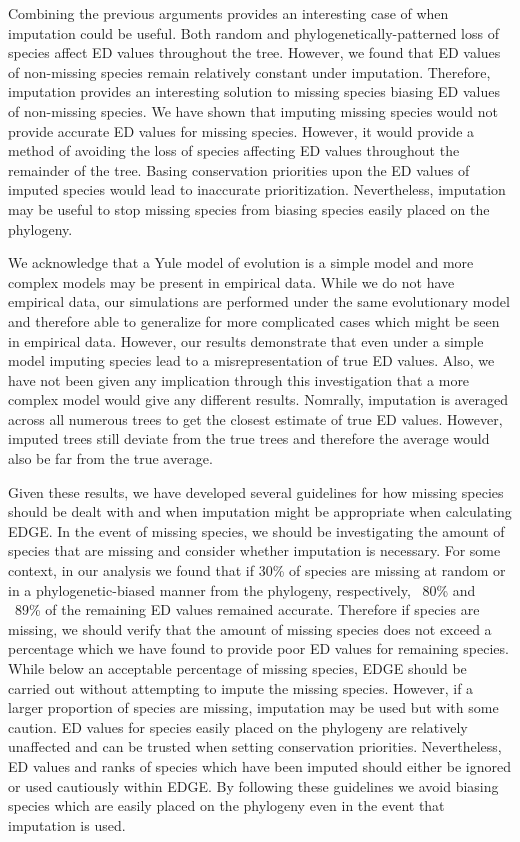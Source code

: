 \documentclass[12pt,english]{article}
\begin{document}
Combining the previous arguments provides an interesting case of when imputation
could be useful. Both random and phylogenetically-patterned loss of species
affect ED values throughout the tree. However, we found that ED values of
non-missing species remain relatively constant under imputation. Therefore,
imputation provides an interesting solution to missing species biasing ED
values of non-missing species. We have shown that imputing missing species would
not provide accurate ED values for missing species. However, it would provide a
method of avoiding the loss of species affecting ED values throughout the
remainder of the tree. Basing conservation priorities upon the ED values of
imputed species would lead to inaccurate prioritization. Nevertheless,
imputation may be useful to stop missing species from biasing species easily
placed on the phylogeny.

We acknowledge that a Yule model of evolution is a simple model and more complex
models may be present in empirical data. While we do not have empirical data,
our simulations are performed under the same evolutionary model and therefore
able to generalize for more complicated cases which might be seen in empirical
data. However, our results demonstrate that even under a simple model imputing
species lead to a misrepresentation of true ED values. Also, we have not been
given any implication through this investigation that a more complex model would
give any different results. Nomrally, imputation is averaged across all numerous
trees to get the closest estimate of true ED values. However, imputed trees
still deviate from the true trees and therefore the average would also be far
from the true average.

Given these results, we have developed several guidelines for how missing
species should be dealt with and when imputation might be appropriate when
calculating EDGE. In the event of missing species, we should be investigating
the amount of species that are missing and consider whether imputation is
necessary. For some context, in our analysis we found that if 30\% of species
are missing at random or in a phylogenetic-biased manner from the phylogeny,
respectively, ~80\% and ~89\% of the remaining ED values remained accurate.
Therefore if species are missing, we should verify that the amount of missing
species does not exceed a percentage which we have found to provide poor ED
values for remaining species. While below an acceptable percentage of missing
species, EDGE should be carried out without attempting to impute the
missing species. However, if a larger proportion of species are missing,
imputation may be used but with some caution. ED values for species easily
placed on the phylogeny are relatively unaffected and can be trusted when
setting conservation priorities. Nevertheless, ED values and ranks of species
which have been imputed should either be ignored or used cautiously within EDGE.
By following these guidelines we avoid biasing species which are easily placed
on the phylogeny even in the event that imputation is used.
\end{document}
